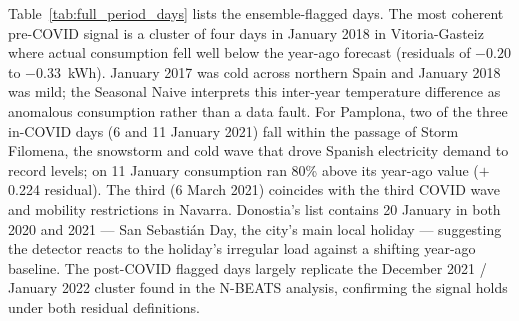 ﻿\documentclass[12pt,reqno, twoside]{amsbook}
\numberwithin{figure}{chapter}
\numberwithin{table}{chapter}
\numberwithin{equation}{chapter}
\theoremstyle{plain}
\numberwithin{equation}{chapter}
\numberwithin{section}{chapter}
\begin{document}
Table~\ref{tab:full_period_days} lists the ensemble-flagged days. The most coherent pre-COVID signal is a cluster of four days in January 2018 in Vitoria-Gasteiz where actual consumption fell well below the year-ago forecast (residuals of $-0.20$ to $-0.33$~kWh). January 2017 was cold across northern Spain and January 2018 was mild; the Seasonal Naive interprets this inter-year temperature difference as anomalous consumption rather than a data fault. For Pamplona, two of the three in-COVID days (6 and 11 January 2021) fall within the passage of Storm Filomena, the snowstorm and cold wave that drove Spanish electricity demand to record levels; on 11 January consumption ran 80\% above its year-ago value ($+$0.224 residual). The third (6 March 2021) coincides with the third COVID wave and mobility restrictions in Navarra. Donostia's list contains 20 January in both 2020 and 2021 --- San Sebasti\'{a}n Day, the city's main local holiday --- suggesting the detector reacts to the holiday's irregular load against a shifting year-ago baseline. The post-COVID flagged days largely replicate the December 2021 / January 2022 cluster found in the N-BEATS analysis, confirming the signal holds under both residual definitions.
\end{document}
